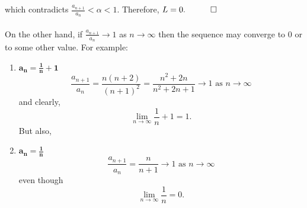 \documentclass[MathsNotesBase.tex]{subfiles}
\begin{document}
{\begin{exe}
{				which contradicts ${ \frac{a_{n+1}}{a_n} < \alpha < 1 }$. Therefore, ${ L = 0.  \hspace{10pt}\qed}$\\\\
				On the other hand, if ${ \frac{a_{n+1}}{a_n} \to 1 }$ as ${ n \to \infty }$ then the sequence may converge to 0 or to some other value. For example:
				\begin{enumerate}[label=(\roman*)]
					\item{${\bm{ a_n = \frac{1}{n} + 1 }}$}
					\[ \frac{a_{n+1}}{a_n} = \frac{n(n+2)}{(n+1)^2} =\frac{n^2 + 2n}{n^2 + 2n + 1} \to 1 \text{ as } n \to \infty \]
					and clearly,
					\[ \lim_{n \to \infty} \frac{1}{n} + 1 = 1. \]
					But also,
					\item{${\bm{ a_n = \frac{1}{n} }}$}
					\[  \frac{a_{n+1}}{a_n} = \frac{n}{n+1} \to 1 \text{ as } n \to \infty \]
					even though
					\[ \lim_{n \to \infty} \frac{1}{n} = 0. \]
				\end{enumerate}
		}
		\end{exe}
	}
	
\end{document}
